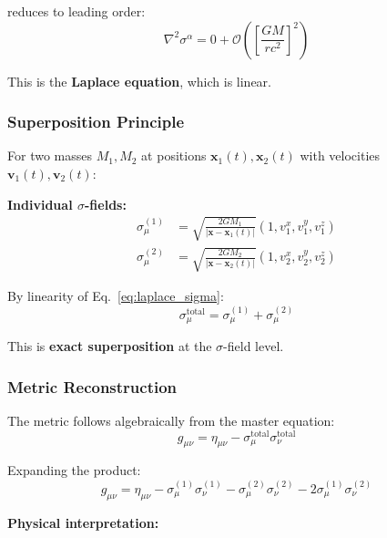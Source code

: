 \documentclass[11pt,a4paper]{article}
\theoremstyle{definition}
\theoremstyle{remark}
\begin{document}
	reduces to leading order:
	\begin{equation}
		\boxed{\nabla^2\sigma^\alpha = 0 + \mathcal{O}\left(\left[\frac{GM}{rc^2}\right]^2\right)}
		\label{eq:laplace_sigma}
	\end{equation}
	
	This is the \textbf{Laplace equation}, which is linear.
	
	\subsubsection{Superposition Principle}
	
	For two masses $M_1, M_2$ at positions $\mathbf{x}_1(t), \mathbf{x}_2(t)$ with velocities $\mathbf{v}_1(t), \mathbf{v}_2(t)$:
	
	\textbf{Individual $\sigma$-fields:}
	\begin{align}
		\sigma_\mu^{(1)} &= \sqrt{\frac{2GM_1}{|\mathbf{x}-\mathbf{x}_1(t)|}}(1, v_1^x, v_1^y, v_1^z) \\
		\sigma_\mu^{(2)} &= \sqrt{\frac{2GM_2}{|\mathbf{x}-\mathbf{x}_2(t)|}}(1, v_2^x, v_2^y, v_2^z)
	\end{align}
	
	By linearity of Eq.~\eqref{eq:laplace_sigma}:
	\begin{equation}
		\boxed{\sigma_\mu^{\text{total}} = \sigma_\mu^{(1)} + \sigma_\mu^{(2)}}
		\label{eq:sigma_superposition}
	\end{equation}
	
	This is \textbf{exact superposition} at the $\sigma$-field level.
	
	\subsubsection{Metric Reconstruction}
	
	The metric follows algebraically from the master equation:
	\begin{equation}
		g_{\mu\nu} = \eta_{\mu\nu} - \sigma_\mu^{\text{total}}\sigma_\nu^{\text{total}}
	\end{equation}
	
	Expanding the product:
	\begin{equation}
		\boxed{g_{\mu\nu} = \eta_{\mu\nu} - \sigma_\mu^{(1)}\sigma_\nu^{(1)} - \sigma_\mu^{(2)}\sigma_\nu^{(2)} - 2\sigma_\mu^{(1)}\sigma_\nu^{(2)}}
		\label{eq:binary_metric}
	\end{equation}
	
	\textbf{Physical interpretation:}
	
\end{document}
